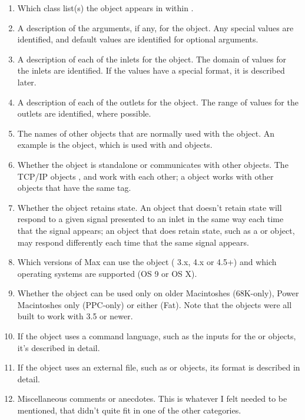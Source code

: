 \begin{enumerate}[  1)]
\item Which class list(s) the object appears in within \MaxName.
\item A description of the arguments, if any, for the object.
Any special values are identified, and default values are identified for optional arguments.
\item A description of each of the inlets for the object.
The domain of values for the inlets are identified.
If the values have a special format, it is described later.
\item A description of each of the outlets for the object.
The range of values for the outlets are identified, where possible.
\item The names of other objects that are normally used with the object.
An example is the  object, which is used with  and  objects.
\item Whether the object is standalone or communicates with other objects.
The TCP/IP objects ,  and  work with each other;
a  object works with other  objects that have the same tag.
\item Whether the object retains state.
An object that doesn't retain state will respond to a given signal presented to an inlet in the same way each time that
the signal appears;
an object that does retain state, such as a  or  object, may respond differently each time
that the same signal appears.
\item Which versions of Max can use the object (\MaxName{} 3.x, \MaxName{} 4.x or \MaxName{} 4.5+) and which operating systems are supported (OS 9 or OS X).
\item Whether the object can be used only on older Macintoshes (68K-only), Power Macintoshes only (PPC-only) or either (Fat).
Note that the objects were all built to work with \MaxName{} 3.5 or newer.
\item If the object uses a command language, such as the inputs for the  or  objects, it's described in
detail.
\item If the object uses an external file, such as  or  objects, its format is described in detail.
\item Miscellaneous comments or anecdotes.
This is whatever I felt needed to be mentioned, that didn't quite fit in one of the other categories.
\end{enumerate}


